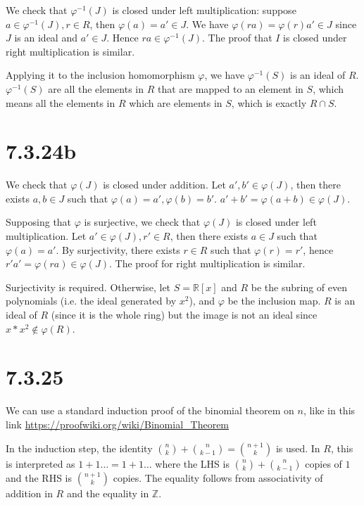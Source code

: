 \documentclass{article}
\def\Z{\mathbb{Z}}
\def\R{\mathbb{R}}
\def\inv{{-1}}
\def\vphi{\varphi}
\begin{document}
We check that $\vphi^\inv(J)$ is closed under left multiplication: suppose $a \in \vphi^\inv(J), r \in R$, then $\vphi(a) = a' \in J$. We have $\vphi(ra) = \vphi(r)a' \in J$ since $J$ is an ideal and $a' \in J$. Hence $ra \in \vphi^\inv(J)$. The proof that $I$ is closed under right multiplication is similar.

Applying it to the inclusion homomorphism $\vphi$, we have $\vphi^\inv(S)$ is an ideal of $R$. $\vphi^\inv(S)$ are all the elements in $R$ that are mapped to an element in $S$, which means all the elements in $R$ which are elements in $S$, which is exactly $R \cap S$.

\section*{7.3.24b}

We check that $\vphi(J)$ is closed under addition. Let $a', b' \in \vphi(J)$, then there exists $a, b \in J$ such that $\vphi(a) = a', \vphi(b) = b'$. $a' + b' = \vphi(a + b) \in \vphi(J)$.

Supposing that $\vphi$ is surjective, we check that $\vphi(J)$ is closed under left multiplication. Let $a' \in \vphi(J), r' \in R$, then there exists $a \in J$ such that $\vphi(a) = a'$. By surjectivity, there exists $r \in R$ such that $\vphi(r) = r'$, hence $r'a' = \vphi(ra) \in \vphi(J)$. The proof for right multiplication is similar.

Surjectivity is required. Otherwise, let $S = \R[x]$ and $R$ be the subring of even polynomials (i.e. the ideal generated by $x^2$), and $\vphi$ be the inclusion map. $R$ is an ideal of $R$ (since it is the whole ring) but the image is not an ideal since $x * x^2 \not\in \vphi(R)$.

\section*{7.3.25}

We can use a standard induction proof of the binomial theorem on $n$, like in this link 
\url{https://proofwiki.org/wiki/Binomial_Theorem}

In the induction step, the identity ${n \choose k} + {n\choose k-1} = {n+1\choose k}$ is used. In $R$, this is interpreted as $1 + 1 \ldots = 1 + 1 \ldots$ where the LHS is ${n \choose k} + {n\choose k-1}$ copies of $1$ and the RHS is ${n+1\choose k}$ copies. The equality follows from associativity of addition in $R$ and the equality in $\Z$.
\end{document}

